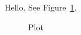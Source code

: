 \documentclass{article}
\begin{document}
Hello. See Figure~\ref{fig:plot}.
\begin{figure}
\caption{Plot}\label{fig:plot}
\end{figure}
\begin{table}
\caption{Orphan}\label{tab:unused}
\end{table}
\end{document}
